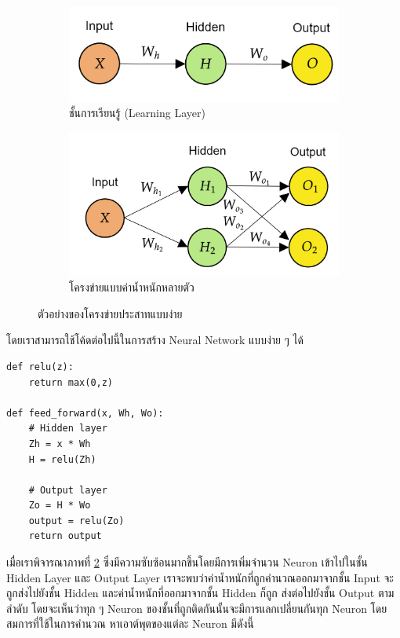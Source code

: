 \begin{figure}[htbp]
    \centering
    \begin{subfigure}{0.5\textwidth}
        \centering
        \includegraphics[width=0.9\linewidth]{fig/nn_layer.png}
        \caption{ชั้นการเรียนรู้ (Learning Layer)}
        \label{fig:nn_layer}
    \end{subfigure}%
    \begin{subfigure}{0.5\textwidth}
        \centering
        \includegraphics[width=0.9\linewidth]{fig/nn_w_matrices.png}
        \caption{โครงข่ายแบบค่าน้ำหนักหลายตัว}
        \label{fig:nn_w_matrices}
    \end{subfigure}
    \caption{ตัวอย่างของโครงข่ายประสาทแบบง่าย}
    \label{fig:nn_layer_w}
\end{figure}

โดยเราสามารถใช้โค้ดต่อไปนี้ในการสร้าง Neural Network แบบง่าย ๆ ได้

\begin{lstlisting}[style=MyPython]
def relu(z):
    return max(0,z)

def feed_forward(x, Wh, Wo):
    # Hidden layer
    Zh = x * Wh
    H = relu(Zh)

    # Output layer
    Zo = H * Wo
    output = relu(Zo)
    return output
\end{lstlisting}

เมื่อเราพิจารณาภาพที่ \ref{fig:nn_w_matrices} ซึ่งมีความซับซ้อนมากขึ้นโดยมีการเพิ่มจำนวน Neuron เข้าไปในชั้น Hidden Layer และ 
Output Layer เราจะพบว่าค่าน้ำหนักที่ถูกคำนวณออกมาจากชั้น Input จะถูกส่งไปยังชั้น Hidden และค่าน้ำหนักที่ออกมาจากชั้น Hidden ก็ถูก%
ส่งต่อไปยังชั้น Output ตามลำดับ โดยจะเห็นว่าทุก ๆ Neuron ของชั้นที่ถูกติดกันนั้นจะมีการแลกเปลี่ยนกันทุก Neuron โดยสมการที่ใช้ในการคำนวณ%
หาเอาต์พุตของแต่ละ Neuron มีดังนี้

